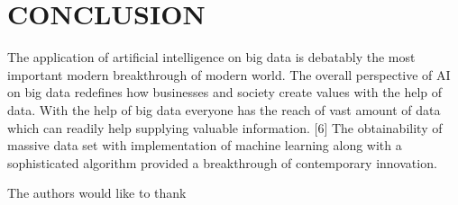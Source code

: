 \documentclass[sigconf]{acmart}
\begin{document}
\section{CONCLUSION}
The application of artificial intelligence on big data is debatably the most important modern breakthrough of modern world. The overall perspective of AI on big data redefines how businesses and society create values with the help of data. With the help of big data everyone has the reach of vast amount of data which can readily help supplying valuable information. [6] The obtainability of massive data set with implementation of machine learning along with a sophisticated algorithm provided a breakthrough of contemporary innovation. 


\begin{acks}

  The authors would like to thank 

\end{acks}


 
\end{document}
